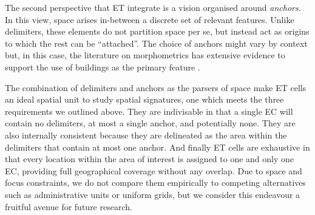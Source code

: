 The second perspective that ET integrate is a vision organised around
\textit{anchors}. In this view, space arises in-between
a discrete set of relevant features. Unlike delimiters, these elements do not
partition space per se, but instead act as origins to which the rest can be
``attached''.
%
The choice of anchors might vary by context but, in this case, the literature on
morphometrics has extensive evidence to support the use of buildings as the
primary feature \citep{hamaina2012a, usui2013estimation, schirmer2015}.


The combination of delimiters and anchors as the parsers of space make ET cells an
ideal spatial unit to study spatial signatures, one which
meets the three requirements we outlined above.
%
They are indivisable in that a single EC will contain no delimiters, at most a
single anchor, and potentially none.
%
They are also internally consistent because they are delineated as the area
within the delimiters that contain at most one anchor.
%
And finally ET cells are exhaustive in that every location within the area of
interest is assigned to one and only one EC, providing full geographical
coverage without any overlap.
%
Due to space and focus constraints, we do not compare them empirically to
competing alternatives such as administrative units or uniform grids, but we
consider this endeavour a fruitful avenue for future research.
